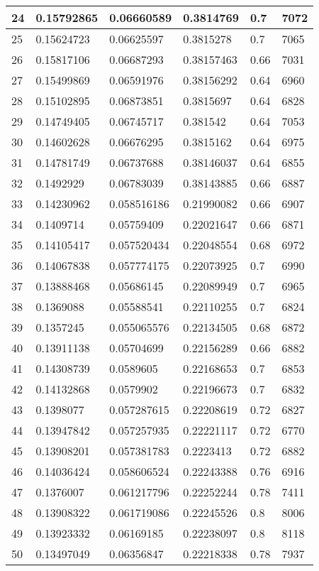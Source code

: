 \begin{longtable}{|l|l|l|l|l|l|}
24 & 0.15792865 & 0.06660589 & 0.3814769 & 0.7 & 7072 \\ \hline 
25 & 0.15624723 & 0.06625597 & 0.3815278 & 0.7 & 7065 \\ \hline 
26 & 0.15817106 & 0.06687293 & 0.38157463 & 0.66 & 7031 \\ \hline 
27 & 0.15499869 & 0.06591976 & 0.38156292 & 0.64 & 6960 \\ \hline 
28 & 0.15102895 & 0.06873851 & 0.3815697 & 0.64 & 6828 \\ \hline 
29 & 0.14749405 & 0.06745717 & 0.381542 & 0.64 & 7053 \\ \hline 
30 & 0.14602628 & 0.06676295 & 0.3815162 & 0.64 & 6975 \\ \hline 
31 & 0.14781749 & 0.06737688 & 0.38146037 & 0.64 & 6855 \\ \hline 
32 & 0.1492929 & 0.06783039 & 0.38143885 & 0.66 & 6887 \\ \hline 
33 & 0.14230962 & 0.058516186 & 0.21990082 & 0.66 & 6907 \\ \hline 
34 & 0.1409714 & 0.05759409 & 0.22021647 & 0.66 & 6871 \\ \hline 
35 & 0.14105417 & 0.057520434 & 0.22048554 & 0.68 & 6972 \\ \hline 
36 & 0.14067838 & 0.057774175 & 0.22073925 & 0.7 & 6990 \\ \hline 
37 & 0.13888468 & 0.05686145 & 0.22089949 & 0.7 & 6965 \\ \hline 
38 & 0.1369088 & 0.05588541 & 0.22110255 & 0.7 & 6824 \\ \hline 
39 & 0.1357245 & 0.055065576 & 0.22134505 & 0.68 & 6872 \\ \hline 
40 & 0.13911138 & 0.05704699 & 0.22156289 & 0.66 & 6882 \\ \hline 
41 & 0.14308739 & 0.0589605 & 0.22168653 & 0.7 & 6853 \\ \hline 
42 & 0.14132868 & 0.0579902 & 0.22196673 & 0.7 & 6832 \\ \hline 
43 & 0.1398077 & 0.057287615 & 0.22208619 & 0.72 & 6827 \\ \hline 
44 & 0.13947842 & 0.057257935 & 0.22221117 & 0.72 & 6770 \\ \hline 
45 & 0.13908201 & 0.057381783 & 0.2223413 & 0.72 & 6882 \\ \hline 
46 & 0.14036424 & 0.058606524 & 0.22243388 & 0.76 & 6916 \\ \hline 
47 & 0.1376007 & 0.061217796 & 0.22252244 & 0.78 & 7411 \\ \hline 
48 & 0.13908322 & 0.061719086 & 0.22245526 & 0.8 & 8006 \\ \hline 
49 & 0.13923332 & 0.06169185 & 0.22238097 & 0.8 & 8118 \\ \hline 
50 & 0.13497049 & 0.06356847 & 0.22218338 & 0.78 & 7937 \\ \hline 
\end{longtable}